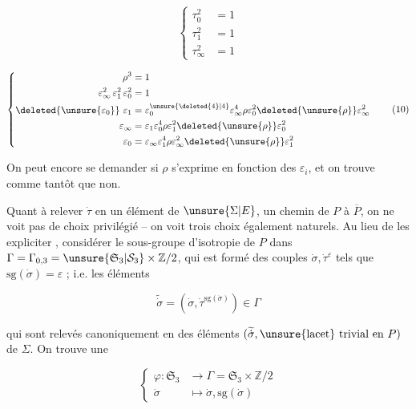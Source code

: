 
\[
\left\{\begin{aligned}
\tau_0^2&=1\\
\tau_1^2&=1\\
\tau_\infty^2&=1
\end{aligned}\right. \tag*{(16)}
\]

\[
\left\{\begin{aligned}
\rho^3&=1\\
\varepsilon_\infty^2\,\varepsilon_1^2\,\varepsilon_0^2&=1\\
\deleted{\unsure{\varepsilon_0}}\ \varepsilon_1&=\varepsilon_0^{\unsure{\deleted{4}|4}}\varepsilon_\infty^4\rho\varepsilon_0^2\deleted{\unsure{\rho}}\varepsilon_\infty^2\\
\varepsilon_\infty&=\varepsilon_1\varepsilon_0^4\rho\varepsilon_1^2\deleted{\unsure{\rho}}\varepsilon_0^2\\
\varepsilon_0&=\varepsilon_\infty\varepsilon_1^4\rho\varepsilon_\infty^2\deleted{\unsure{\rho}}\varepsilon_1^2
\end{aligned}\right. \tag*{(10)}
\]


On peut encore se demander si $\rho$ s'exprime en fonction des $\varepsilon_i$, et on trouve comme tantôt que non.

Quant à relever $\dot\tau$ en un élément de $\unsure{\Sigma|E}$,  un chemin de $P$ à $\overline P$, on ne voit pas de choix privilégié -- on voit trois choix également naturels. Au lieu de les expliciter ,  considérer le sous-groupe d'isotropie de $P$ dans $\Gamma=\Gamma_{0,3}=\unsure{\mathfrak S_3|\mathcal S_3}\times\mathbb Z/2$, qui est formé des couples $\dot\sigma,\dot\tau^\varepsilon$ tels que $\mathrm{sg}(\dot\sigma)=\varepsilon$ ;  i.e. les éléments

\[
\widetilde{\dot\sigma}=(\dot\sigma,\dot\tau^{\mathrm{sg}(\dot\sigma)})\in\Gamma
\]

qui sont relevés canoniquement en des éléments $(\widetilde{\dot\sigma},\text{\unsure{lacet} trivial en }P)$ de $\Sigma$. On trouve une 

\[
\left\{\begin{aligned}
\varphi:\mathfrak S_3&\longrightarrow\Gamma=\mathfrak S_3\times\mathbb Z/2\\
\dot\sigma&\longmapsto\dot\sigma,\mathrm{sg}(\dot\sigma)
\end{aligned}\right. \tag*{(11)}
\]

